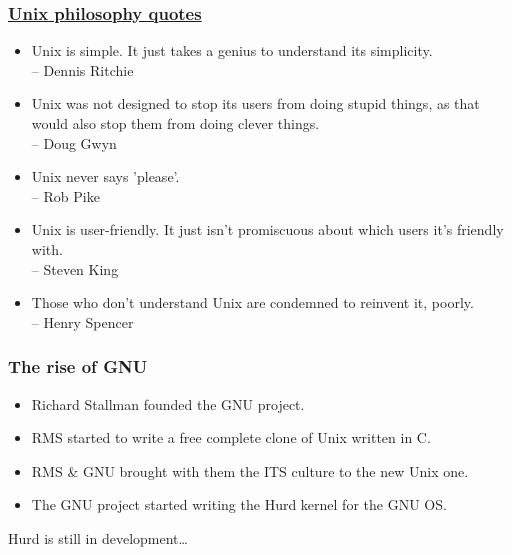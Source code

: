 \documentclass[hyperref={pdfpagelabels=false},xcolor=pst,pdf,fragile]{beamer}
\begin{document}
\begin{frame}
	\frametitle{
		\href{https://en.wikipedia.org/wiki/Unix_philosophy\#Quotes}
		{Unix philosophy quotes}
	}

  \begin{itemize}
	  \item Unix is simple. It just takes a genius to understand its
		  simplicity. \\
		  – Dennis Ritchie

	  \item Unix was not designed to stop its users from doing stupid
		  things, as that would also stop them from doing clever things. \\
		  – Doug Gwyn

	  \item Unix never says 'please'. \\
		  – Rob Pike

		  \pause
	  \item Unix is user-friendly. It just isn't promiscuous about which
		  users it's friendly with.\\
		  – Steven King

	  \item Those who don't understand Unix are condemned to reinvent it,
		  poorly.\\
		  – Henry Spencer

  \end{itemize}

\end{frame}

\begin{frame}
  \frametitle{The rise of GNU}

  \begin{itemize}
	  \item Richard Stallman founded the GNU project.
	  \item RMS started to write a \alert{free} complete clone of Unix written in C.
	  \item RMS \& GNU brought with them the ITS culture to the new Unix one.
	  \item The GNU project started writing the Hurd kernel for the GNU OS.
  \end{itemize}

  \hskip-20pt
  \pause
  \begin{center}
	  Hurd is still in development\ldots
  \end{center}

\end{frame}
\end{document}
